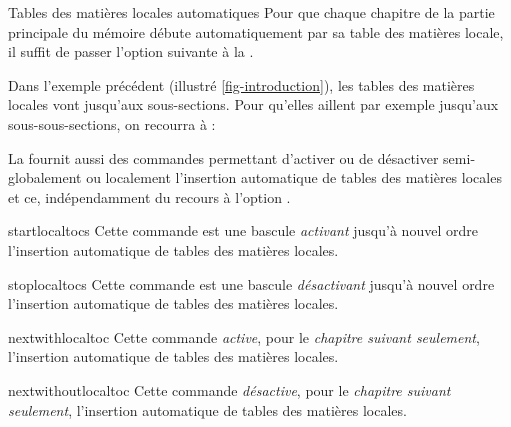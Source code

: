 \begin{dbexample}{Tables des matières locales automatiques}{}
  Pour que chaque chapitre de la partie principale du mémoire débute
  automatiquement par sa table des matières locale, il suffit de passer l'option
  suivante à la \yatCl{}.

  Dans l'exemple précédent (illustré \vref{fig-introduction}), les tables des
  matières locales vont jusqu'aux sous-sections. Pour qu'elles aillent par
  exemple jusqu'aux sous-sous-sections, on recourra à :
\end{dbexample}

La \yatCl{} fournit aussi des commandes permettant d'activer ou de désactiver
semi-globalement ou localement l'insertion automatique de tables des matières
locales et ce, indépendamment du recours à l'option .

\begin{docCommand}[doc new=2016-10-30]{startlocaltocs}{}
  Cette commande est une bascule \emph{activant} jusqu'à nouvel ordre
  l'insertion automatique de tables des matières locales.
\end{docCommand}

\begin{docCommand}[doc new=2016-10-30]{stoplocaltocs}{}
  Cette commande est une bascule \emph{désactivant} jusqu'à nouvel ordre
  l'insertion automatique de tables des matières locales.
\end{docCommand}

\begin{docCommand}[doc new=2016-10-30]{nextwithlocaltoc}{}
  Cette commande \emph{active}, pour le \emph{chapitre suivant seulement},
  l'insertion automatique de tables des matières locales.
\end{docCommand}

\begin{docCommand}[doc new=2016-10-30]{nextwithoutlocaltoc}{}
  Cette commande \emph{désactive}, pour le \emph{chapitre suivant seulement},
  l'insertion automatique de tables des matières locales.
\end{docCommand}

